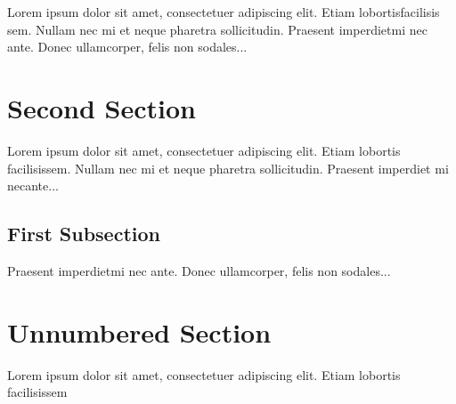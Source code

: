 \documentclass[12pt, letterpaper]{article}
\begin{document}
Lorem  ipsum  dolor  sit  amet,  consectetuer  adipiscing  
elit.   Etiam  lobortisfacilisis sem.  Nullam nec mi et 
neque pharetra sollicitudin.  Praesent imperdietmi nec ante. 
Donec ullamcorper, felis non sodales...

\section{Second Section}

Lorem ipsum dolor sit amet, consectetuer adipiscing elit.  
Etiam lobortis facilisissem.  Nullam nec mi et neque pharetra 
sollicitudin.  Praesent imperdiet mi necante...

\subsection{First Subsection}
Praesent imperdietmi nec ante. Donec ullamcorper, felis non sodales...

\section*{Unnumbered Section}
Lorem ipsum dolor sit amet, consectetuer adipiscing elit.  
Etiam lobortis facilisissem
\end{document}
